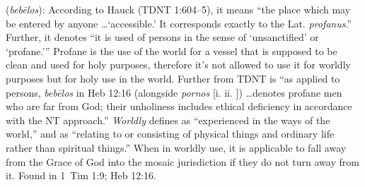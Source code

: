 \item[Worldly,]

(\textit{bebēlos}):
According to Hauck (TDNT 1:604--5), it means ``the place which may be entered by anyone \ldots `accessible.' It corresponds exactly to the Lat. \emph{profanus}.'' Further, it denotes ``it is used of persons in the sense of `unsanctified' or `profane.''' Profane is the use of the world for a vessel that is supposed to be clean and used for holy purposes, therefore it's not allowed to use it for worldly purposes but for holy use in the world. Further from TDNT is ``as applied to persons, \emph{bebēlos} in Heb 12:16 (alongside \emph{pornos} [i.  ii. ]) \ldots denotes profane men who are far from God; their unholiness includes ethical deficiency in accordance with the NT approach.'' \emph{Worldly} defines as ``experienced in the ways of the world,'' and as ``relating to or consisting of physical things and ordinary life rather than spiritual things.'' When in worldly use, it is applicable to fall away from the Grace of God into the mosaic jurisdiction if they do not turn away from it.
Found in 1~Tim 1:9; Heb 12:16.
